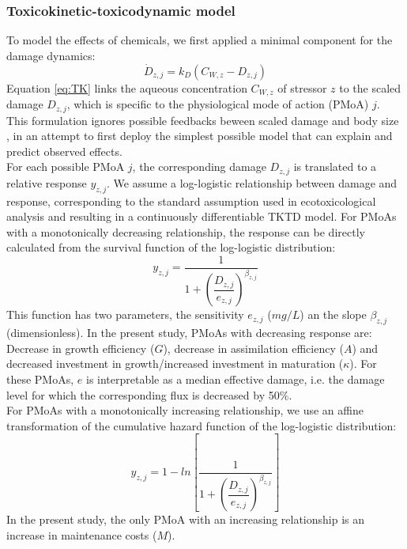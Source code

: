 \documentclass[utf8]{FrontiersinHarvard} %
\begin{document}
\subsubsection{Toxicokinetic-toxicodynamic model}
%
To model the effects of chemicals, we first applied a minimal component for the damage dynamics: 
%
\begin{equation}
    \dot{D}_{z,j} = k_D \left( C_{W,z}  - D_{z,j} \right)
    \label{eq:TK}
\end{equation}
%
Equation \ref{eq:TK} links the aqueous concentration $C_{W,z}$ of stressor $z$ to 
the scaled damage $D_{z,j}$, which is specific to the physiological mode of action (PMoA) $j$.
This formulation ignores possible feedbacks beween scaled damage and body size \citep{jagerRevisitingSimplifiedDEBtox2020}, 
in an attempt to first deploy the simplest possible model that can explain and predict observed effects. \\ 
For each possible PMoA $j$, the corresponding damage $D_{z,j}$ is translated to a relative response $y_{z,j}$. 
We assume a log-logistic relationship between damage and response, 
corresponding to the standard assumption used in ecotoxicological analysis and resulting in a continuously differentiable 
TKTD model. 
For PMoAs with a monotonically decreasing relationship, the response can be directly calculated from the survival function 
of the log-logistic distribution:
%
\begin{equation}
    y_{z,j} = \dfrac{1}{ 1 + \left( \dfrac{D_{z,j}} {e_{z,j}} \right) ^ {\beta_{z,j}} }
    \label{eq:TD_decrease}
\end{equation}
%
This function has two parameters, the sensitivity $e_{z,j}$ ($mg/L$) an the slope $\beta_{z,j}$ (dimensionless). 
In the present study, PMoAs with decreasing response are: 
Decrease in growth efficiency ($G$), 
decrease in assimilation efficiency ($A$) 
and decreased investment in growth/increased investment in maturation ($\kappa$).
For these PMoAs, $e$ is interpretable as a median effective damage, i.e. the damage level  
for which the corresponding flux is decreased by 50\%. \\
For PMoAs with a monotonically increasing relationship, we use an affine transformation of the cumulative hazard 
function of the log-logistic distribution:
%
\begin{equation}
    y_{z,j} = 1 - ln \left[ \frac{1}{ 1 + \left( \dfrac{D_{z,j}} {e_{z,j}} \right) ^ {\beta_{z,j}} } \right]
    \label{eq:TD_increase}
\end{equation}
%
In the present study, the only PMoA with an increasing relationship is an increase in maintenance costs ($M$).
\end{document}
